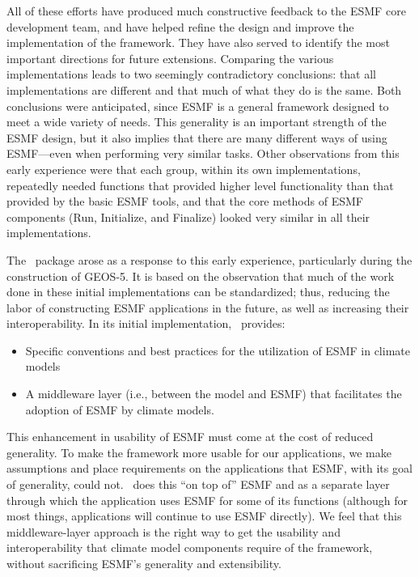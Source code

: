 All of these efforts have produced much constructive feedback to the
ESMF core development team, and have helped refine the design and
improve the implementation of the framework. They have also served to
identify the most important directions for future extensions.
Comparing the various implementations leads to two seemingly
contradictory conclusions: that all implementations are different and
that much of what they do is the same.  Both conclusions were
anticipated, since ESMF is a general framework designed to meet a wide
variety of needs.  This generality is an important strength of the
ESMF design, but it also implies that there are many different ways of
using ESMF---even when performing very similar tasks. Other
observations from this early experience were that each group, within
its own implementations, repeatedly needed functions that provided
higher level functionality than that provided by the basic ESMF tools,
and that the core methods of ESMF components (Run, Initialize, and
Finalize) looked very similar in all their implementations.

The \ggn\   package arose as a response to this early
experience, particularly during the construction of GEOS-5.
It is based on the observation that much of the work done in these initial
implementations can be standardized; thus, reducing the labor of
constructing ESMF applications in the future, as well as increasing
their interoperability. In its initial implementation, \ggn\  
provides:

\begin{itemize}

\item Specific conventions and best practices for the utilization 
of ESMF in climate models

\item  A middleware layer (i.e., between the model and ESMF) that
facilitates the adoption of ESMF by climate models.

\end{itemize}

This enhancement in usability of ESMF must come at the cost of reduced
generality. To make the framework more usable for our applications, we
make assumptions and place requirements on the applications that ESMF,
with its goal of generality, could not. \ggn\   does this 
``on top of'' ESMF and as a separate layer through which the
application uses ESMF for some of its functions (although for most
things, applications will continue to use ESMF directly). We feel that
this middleware-layer approach is the right way to get the usability
and interoperability that climate model components require of the
framework, without sacrificing ESMF's generality and extensibility.


